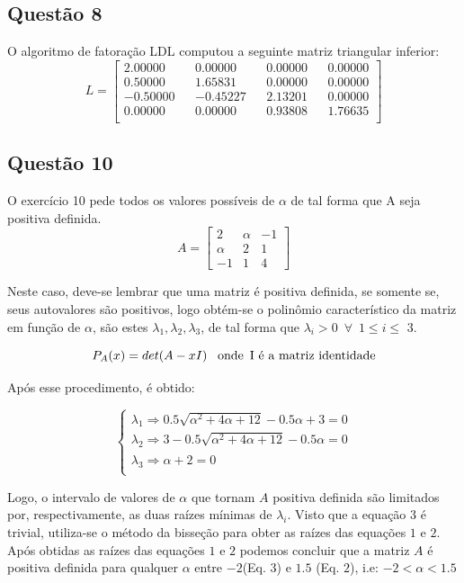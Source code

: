 \documentclass[a4paper, 11pt]{article}
\begin{document}
\subsection*{Questão 8}
O algoritmo de fatoração LDL computou a seguinte matriz triangular inferior:
$$
L = \begin{bmatrix}
   2.00000 &&  0.00000 &&  0.00000 &&  0.00000 \\
   0.50000 &&  1.65831 &&  0.00000 &&  0.00000 \\
  -0.50000 && -0.45227 &&  2.13201 &&  0.00000 \\
   0.00000 &&  0.00000 &&  0.93808 &&  1.76635 \\
\end{bmatrix}
$$

\subsection*{Questão 10}
O exercício 10 pede todos os valores possíveis de $\alpha$ de tal forma que A seja positiva definida.
$$
A = 
\begin{bmatrix}
2 & \alpha  & -1 \\ 
\alpha & 2 & 1 \\ 
-1 & 1 & 4
\end{bmatrix}
$$

Neste caso, deve-se lembrar que uma matriz é positiva definida, se somente se, seus autovalores são positivos, logo obtém-se o polinômio característico da matriz em função de $\alpha$, 
são estes $\lambda_1, \lambda_2, \lambda_3$, de tal forma que $\lambda_i>0\phantom{0}\forall \phantom{0}1\leq i \leq$ 3.


$$
P_A(x) = det(A-xI) \text{\phantom{0} onde\phantom{0}I é a matriz identidade}
$$

Após esse procedimento, é obtido:

$$
\left\{\begin{matrix}
\lambda_1 \Rightarrow 0.5\sqrt{\alpha^2+4\alpha+12} - 0.5\alpha+3 = 0\\ 
\lambda_2 \Rightarrow 3-0.5\sqrt{\alpha^2+4\alpha+12} - 0.5\alpha = 0\\ 
\lambda_3 \Rightarrow \alpha+2 = 0\phantom{\sqrt{\alpha^2+4\alpha+12} - 0.55\alpha}\\
\end{matrix}\right.
$$

Logo, o intervalo de valores de $\alpha$ que tornam $A$ positiva definida são limitados por, respectivamente, as duas raízes mínimas de $\lambda_i$. Visto que a equação $3$ é trivial, utiliza-se o método da bisseção para
obter as raízes das equações $1$ e $2$. Após obtidas as raízes das equações $1$ e $2$ podemos concluir que a matriz $A$ é positiva definida para qualquer $\alpha$ entre $-2$(Eq. $3$) e $1.5$ (Eq. $2$), i.e: $-2<\alpha<1.5$
\end{document}
